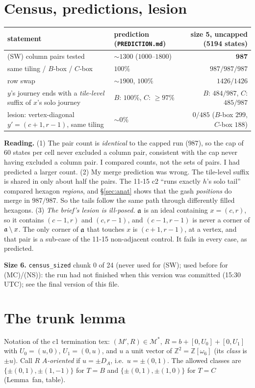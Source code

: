 \documentclass[11pt]{article}
\theoremstyle{definition}\newtheorem{definition}[theorem]{Definition}\newtheorem{remark}[theorem]{Remark}
\newcommand{\Z}{\mathbb Z}\newcommand{\R}{\mathbb R}\newcommand{\M}{\mathcal M}
\begin{document}
\section{Census, predictions, lesion}\label{sec:census}
\begin{center}\small\begin{tabular}{llr}\toprule
statement & prediction (\texttt{PREDICTION.md}) & size 5, uncapped (5194 states)\\\midrule
(SW) column pairs tested & $\sim1300$ ($1000$--$1800$) & $\mathbf{987}$\\
\quad same tiling / $B$-box / $C$-box & $100\%$ & $987/987/987$\\
row swap & $\sim1900$, $100\%$ & $1426/1426$\\
$y$'s journey ends with a \emph{tile-level} suffix of $x$'s solo journey & $B$: $100\%$, $C$: $\ge97\%$ & $B$: $484/987$, $C$: $485/987$\\
lesion: vertex-diagonal $y'=(c+1,r-1)$, same tiling & $\sim0\%$ & $0/485$ ($B$-box $299$, $C$-box $188$)\\\bottomrule
\end{tabular}\end{center}
\textbf{Reading.} (1) The pair count is \emph{identical} to the capped run ($987$), so the cap of 60 states per cell never excluded
a column pair, consistent with the cap never having excluded a column pair. I compared counts, not the sets of pairs. I had predicted a larger count. (2) My merge prediction was wrong.
The tile-level suffix is shared in only about half the pairs. The 11-15 c2 ``runs exactly $h$'s solo tail'' compared hexagon
\emph{regions}, and \S\ref{sec:anat} shows that the gash \emph{positions} do merge in $987/987$. So the tails follow the same path
through differently filled hexagons. (3) \emph{The brief's lesion is ill-posed.} $\mathfrak a$ is an ideal containing $x=(c,r)$, so it contains
$(c-1,r)$ and $(c,r-1)$, and $(c-1,r-1)$ is never a corner of $\mathfrak a\setminus x$. The only corner of $\mathfrak a$ that touches $x$ is
$(c+1,r-1)$, at a vertex, and that pair is a sub-case of the 11-15 non-adjacent control. It fails in every case, as predicted.

\textbf{Size 6.} \texttt{census\_sized} chunk 0 of 24 (never used for (SW); used before for (MC)/(NS)): the run had not finished when this version was committed (15:30 UTC); see the final version of this file.

\section{The trunk lemma}\label{sec:trunk}
Notation of the c1 termination tex: $(M',R)\in\M^*$, $R=b+[0,U_0]+[0,U_1]$ with $U_0=(u,0)$, $U_1=(0,u)$, and $u$ a unit vector
of $\Z^2=\Z[\omega_6]$ (its \emph{class} is $\pm u$). Call $R$ \emph{$A$-oriented} if $u=\pm D_A$, i.e.\ $u=\pm(0,1)$. The allowed classes are
$\{\pm(0,1),\pm(1,-1)\}$ for $T=B$ and $\{\pm(0,1),\pm(1,0)\}$ for $T=C$ (Lemma~fan, table).
\end{document}
